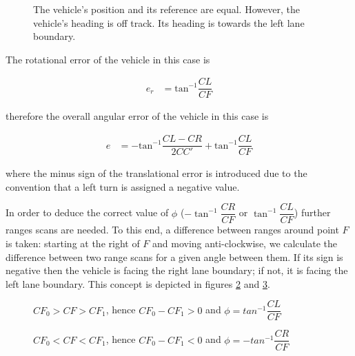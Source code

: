 \begin{figure}[H]\centering
  \scalebox{1}{}
  \caption{The vehicle's position and its reference are equal. However,
    the vehicle's heading is off track. Its heading is towards the left
    lane boundary.}
  \label{}
\end{figure}

The rotational error of the vehicle in this case is

\begin{align}
  e_r &= \text{tan}^{-1}\dfrac{CL}{CF}
\end{align}

therefore the overall angular error of the vehicle in this case is

\begin{align}
  e &= -\text{tan}^{-1}\dfrac{CL-CR}{2CC'} + \text{tan}^{-1}\dfrac{CL}{CF}
\end{align}

where the minus sign of the translational error is introduced due to the
convention that a left turn is assigned a negative value.


In order to deduce the correct value of $\phi$ ($-\tan^{-1}\dfrac{CR}{CF}$ or
$\tan^{-1}\dfrac{CL}{CF}$) further ranges scans are needed. To this end,
a difference between ranges around point $F$ is taken: starting at the
right of $F$ and moving anti-clockwise, we calculate the difference between
two range scans for a given angle between them. If its sign
is negative then the vehicle is facing the right lane boundary; if not,
it is facing the left lane boundary. This concept is depicted in figures
\ref{fig:range_diff_positive} and  \ref{fig:range_diff_negative}.

\begin{figure}[H]\centering
  \scalebox{1}{}
  \caption{$CF_0 > CF > CF_1$, hence $CF_0 - CF_1 > 0$ and $\phi = tan^{-1} \dfrac{CL}{CF}$}
  \label{fig:range_diff_positive}
\end{figure}

\begin{figure}[H]\centering
  \scalebox{1}{}
  \caption{$CF_0 < CF < CF_1$, hence $CF_0 - CF_1 < 0$ and $\phi = -tan^{-1} \dfrac{CR}{CF}$}
  \label{fig:range_diff_negative}
\end{figure}












